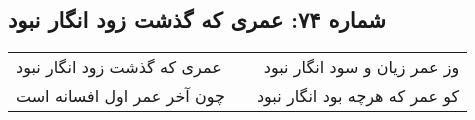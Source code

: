 \begin{center}
\section*{شماره ۷۴: عمری که گذشت زود انگار نبود}
\label{sec:074}
\begin{longtable}{l p{0.5cm} r}
عمری که گذشت زود انگار نبود
&&
وز عمر زیان و سود انگار نبود
\\
چون آخر عمر اول افسانه است
&&
کو عمر که هرچه بود انگار نبود
\\
\end{longtable}
\end{center}
